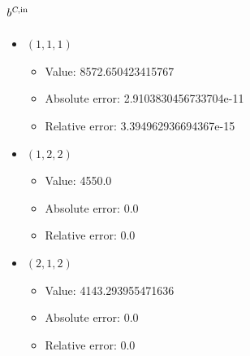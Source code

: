 \documentclass{article}%
\begin{document}
\subsection{$b^{\textsl{C},\text{in}}$}%
\begin{itemize}%
	\item $(1, 1, 1)$%
	\begin{itemize}%
		\item Value: 8572.650423415767%
		\item Absolute error: 2.9103830456733704e-11%
		\item Relative error: 3.394962936694367e-15%
	\end{itemize}%
	\item $(1, 2, 2)$%
	\begin{itemize}%
		\item Value: 4550.0%
		\item Absolute error: 0.0%
		\item Relative error: 0.0%
	\end{itemize}%
	\item $(2, 1, 2)$%
	\begin{itemize}%
		\item Value: 4143.293955471636%
		\item Absolute error: 0.0%
		\item Relative error: 0.0%
	\end{itemize}%
\end{itemize}%
\end{document}
